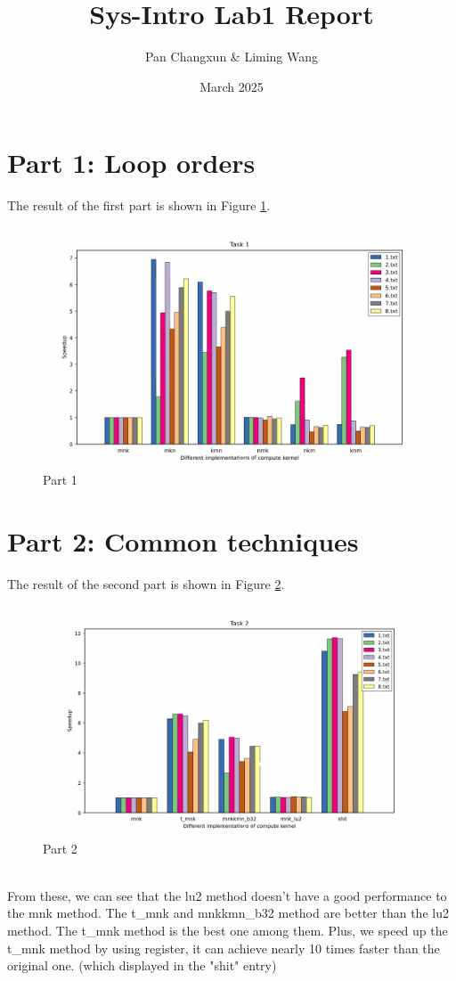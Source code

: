 \documentclass[]{article}
\title{\textbf{Sys-Intro Lab1 Report}}
\author{Pan Changxun \& Liming Wang}
\date{March 2025}
\begin{document}
\maketitle

\section*{Part 1: Loop orders}
The result of the first part is shown in Figure \ref{fig:part1}.
\begin{figure}[h]
		\centering
		\includegraphics[width=1.0\textwidth]{task1.png}
		\caption{Part 1}
		\label{fig:part1}
\end{figure}

\newpage
\section*{Part 2: Common techniques}
The result of the second part is shown in Figure \ref{fig:part2}.
\begin{figure}[h]
		\centering
		\includegraphics[width=1.0\textwidth]{task2.png}
		\caption{Part 2}
		\label{fig:part2}
\end{figure}
\\
From these, we can see that the lu2 method doesn't have a good performance to the mnk method. The t\_mnk and mnkkmn\_b32 method are better than the lu2 method. The t\_mnk method is the best one among them. Plus, we speed up the t\_mnk method by using register, it can achieve nearly 10 times faster than the original one. (which displayed in the "shit" entry)
\newpage
\end{document}
